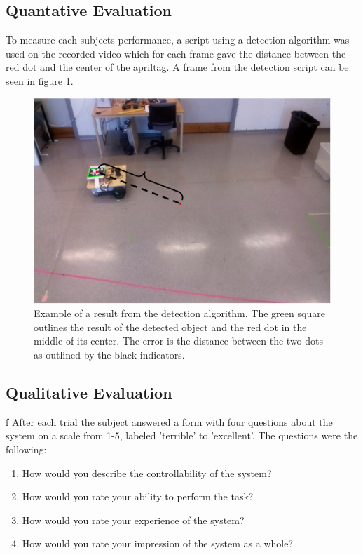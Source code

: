 \documentclass[nofilelist]{cslthse-msc}
\begin{document}
\subsection{Quantative Evaluation}
To measure each subjects performance, a script using a detection algorithm was used on the recorded video which for each frame gave the distance between the red dot and the center of the apriltag. A frame from the detection script can be seen in figure \ref{fig:resultcalc}.

\begin{figure}[!hbt]
   \centering
   \includegraphics[scale=0.3]{images/resultcalc.png} 
   \caption{Example of a result from the detection algorithm. The green square outlines the result of the detected object and the red dot in the middle of its center. The error is the distance between the two dots as outlined by the black indicators.}
   \label{fig:resultcalc}
\end{figure}

\subsection{Qualitative Evaluation}f
After each trial the subject answered a form with four questions about the system on a scale from 1-5, labeled 'terrible' to 'excellent'. The questions were the following:
\begin{enumerate}
   \item How would you describe the controllability of the system?
   \item How would you rate your ability to perform the task?
   \item How would you rate your experience of the system?
   \item How would you rate your impression of the system as a whole?
\end{enumerate}
\end{document}
